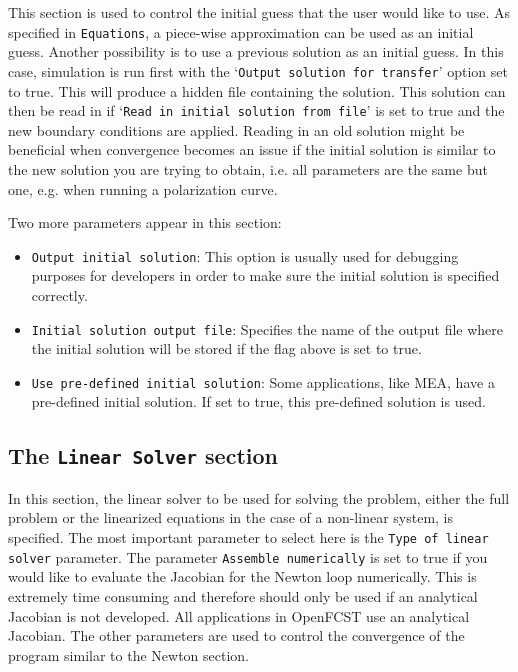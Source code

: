 This section is used to control the initial guess that the user would like to use. As specified in \texttt{Equations}, a piece-wise approximation can be used as an initial guess. Another possibility is to use a previous solution as an initial guess. In this case, simulation is run first with the `\texttt{Output solution for transfer}' option set to true. This will produce a hidden file containing the solution. This solution can then be read in if `\texttt{Read in initial solution from file}' is set to true and the new boundary conditions are applied. Reading in an old solution might be beneficial when convergence becomes an issue if the initial solution is similar to the new solution you are trying to obtain, i.e. all parameters are the same but one, e.g. when running a polarization curve. 

Two more parameters appear in this section:
\begin{itemize}
 \item \texttt{Output initial solution}: This option is usually used for debugging purposes for developers in order to make sure the initial solution is specified correctly.
 \item \texttt{Initial solution output file}: Specifies the name of the output file where the initial solution will be stored if the flag above is set to true.
 \item \texttt{Use pre-defined initial solution}: Some applications, like MEA, have a pre-defined initial solution. If set to true, this pre-defined solution is used.
\end{itemize}

\subsection{The \texttt{Linear Solver} section}
 
In this section, the linear solver to be used for solving the problem, either the full problem or the linearized equations in the case of a non-linear system, is specified. The most important parameter to select here is the \texttt{Type of linear solver} parameter. The parameter \texttt{Assemble numerically} is set to true if you would like to evaluate the Jacobian for the Newton loop numerically. This is extremely time consuming and therefore should only be used if an analytical Jacobian is not developed. All applications in OpenFCST use an analytical Jacobian. The other parameters are used to control the convergence of the program similar to the Newton section.
 
